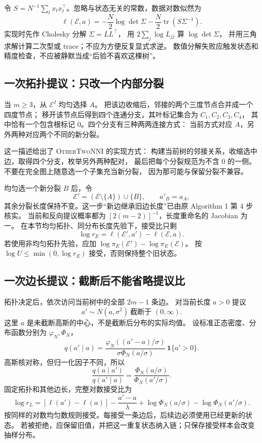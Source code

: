 令 $S=N^{-1}\sum_tx_tx_t^\top$。忽略与状态无关的常数，数据对数似然为
\begin{equation}
 \ell(\mathcal E,a)
 =-\frac N2\log\det\Sigma
  -\frac N2\operatorname{tr}(S\Sigma^{-1}).
 \label{eq:textbook-S16-loglik}
\end{equation}
实现时先作 Cholesky 分解 $\Sigma=LL^\top$，
用 $2\sum_j\log L_{jj}$ 算 $\log\det\Sigma$，
并用三角求解计算二次型或 trace；不应为方便反复显式求逆。
数值分解失败应触发状态和精度检查，不应被静默当成“后验不喜欢这棵树”。

\subsection{一次拓扑提议：只改一个内部分裂}

当 $m\ge3$，从 $\mathcal E^I$ 均匀选择 $A$。
把该边收缩后，邻接的两个三度节点合并成一个四度节点；
移开该节点后得到四个连通分支，其叶标记集合为 $C_1,C_2,C_3,C_4$，
其中恰有一个包含根标记 $0$。四个分支有三种两两连接方式：
当前方式对应 $A$，另外两种对应两个不同的新分裂。

这一描述给出了 \textsc{OtherTwoNNI} 的实现方式：
构建当前树的邻接关系，收缩选中边，取得四个分支，枚举另外两种配对，
最后把每个分裂规范为不含 $0$ 的一侧。不要在完全图上随意选一个子集充当新分裂，
因为那可能与保留分裂不兼容。

均匀选一个新分裂 $B$ 后，令
\[
 \mathcal E'=(\mathcal E\setminus\{A\})\cup\{B\},\qquad
 a'_B=a_A,
\]
其余分裂长度保持不变。这一步“新边继承旧边长度”已由原 Algorithm 1 第 4 步核实。
当前和反向提议概率都为 $[2(m-2)]^{-1}$，长度重命名的 Jacobian 为一。
在本节均匀拓扑、同分布长度先验下，接受比只剩
\[
 \log r_E=\ell(\mathcal E',a')-\ell(\mathcal E,a).
\]
若使用非均匀拓扑先验，应加
$\log\pi_E(\mathcal E')-\log\pi_E(\mathcal E)$。
按 $\log U\le\min(0,\log r_E)$ 接受，否则保持整个旧状态。

\subsection{一次边长提议：截断后不能省略提议比}

拓扑决定后，依次访问当前树中的全部 $2m-1$ 条边。
对当前长度 $a>0$ 提议
\[
 a'\sim N(a,\sigma^2)\ \text{截断于 }(0,\infty).
\]
这里 $a$ 是未截断高斯的中心，不是截断后分布的实际均值。
设标准正态密度、分布函数分别为 $\varphi_N,\Phi_N$，
\[
 q(a'\mid a)=
 \frac{\varphi_N((a'-a)/\sigma)}
 {\sigma\Phi_N(a/\sigma)}\,\mathbf1\{a'>0\}.
\]
高斯核对称，但归一化因子不同，所以
\[
 \frac{q(a\mid a')}{q(a'\mid a)}
 =\frac{\Phi_N(a/\sigma)}{\Phi_N(a'/\sigma)}.
\]
固定拓扑和其他边长，完整对数接受比为
\begin{equation}
 \log r_L=
 [\ell(a')-\ell(a)]
 -\frac{a'-a}{\lambda}
 +\log\Phi_N(a/\sigma)-\log\Phi_N(a'/\sigma).
 \label{eq:textbook-S16-length-ratio}
\end{equation}
按同样的对数均匀数规则接受。每接受一条边后，后续边必须使用已经更新的状态。
若被拒绝，应保留旧值，并把这一重复状态纳入链；只保存接受样本会改变抽样分布。

